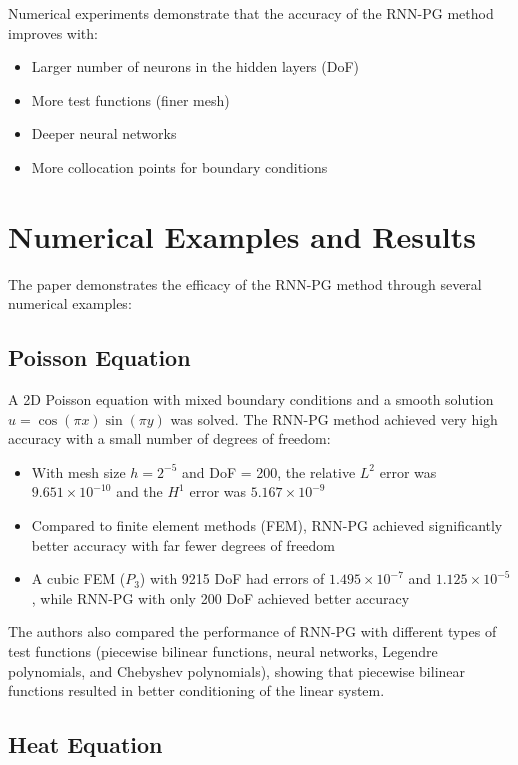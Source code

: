 \documentclass[11pt,a4paper]{article}
\begin{document}
Numerical experiments demonstrate that the accuracy of the RNN-PG method improves with:
\begin{itemize}
    \item Larger number of neurons in the hidden layers (DoF)
    \item More test functions (finer mesh)
    \item Deeper neural networks
    \item More collocation points for boundary conditions
\end{itemize}

\section{Numerical Examples and Results}

The paper demonstrates the efficacy of the RNN-PG method through several numerical examples:

\subsection{Poisson Equation}

A 2D Poisson equation with mixed boundary conditions and a smooth solution $u = \cos(\pi x)\sin(\pi y)$ was solved. The RNN-PG method achieved very high accuracy with a small number of degrees of freedom:
\begin{itemize}
    \item With mesh size $h = 2^{-5}$ and DoF = 200, the relative $L^2$ error was $9.651 \times 10^{-10}$ and the $H^1$ error was $5.167 \times 10^{-9}$
    \item Compared to finite element methods (FEM), RNN-PG achieved significantly better accuracy with far fewer degrees of freedom
    \item A cubic FEM ($P_3$) with 9215 DoF had errors of $1.495 \times 10^{-7}$ and $1.125 \times 10^{-5}$, while RNN-PG with only 200 DoF achieved better accuracy
\end{itemize}

The authors also compared the performance of RNN-PG with different types of test functions (piecewise bilinear functions, neural networks, Legendre polynomials, and Chebyshev polynomials), showing that piecewise bilinear functions resulted in better conditioning of the linear system.

\subsection{Heat Equation}
\end{document}
